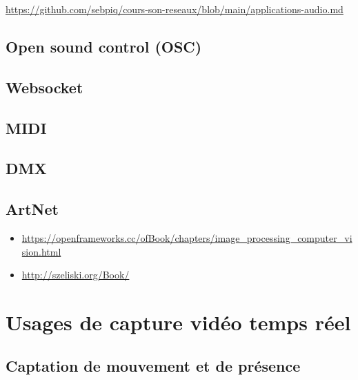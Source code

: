 \documentclass[
  french,
]{book}
\providecommand{\tightlist}{%
  \setlength{\itemsep}{0pt}\setlength{\parskip}{0pt}}
\begin{document}
\url{https://github.com/sebpiq/cours-son-reseaux/blob/main/applications-audio.md}

\hypertarget{protocole_osc}{%
\subsection{Open sound control (OSC)}\label{protocole_osc}}

\hypertarget{protocole_websocket}{%
\subsection{Websocket}\label{protocole_websocket}}

\hypertarget{protocole_midi}{%
\subsection{MIDI}\label{protocole_midi}}

\hypertarget{protocole_dmx}{%
\subsection{DMX}\label{protocole_dmx}}

\hypertarget{protocole_artnet}{%
\subsection{ArtNet}\label{protocole_artnet}}

\begin{itemize}
\tightlist
\item
  \url{https://openframeworks.cc/ofBook/chapters/image_processing_computer_vision.html}
\item
  \url{http://szeliski.org/Book/}
\end{itemize}

\hypertarget{usages-de-capture-viduxe9o-temps-ruxe9el}{%
\section{Usages de capture vidéo temps réel}\label{usages-de-capture-viduxe9o-temps-ruxe9el}}

\hypertarget{captation-de-mouvement-et-de-pruxe9sence}{%
\subsection{Captation de mouvement et de présence}\label{captation-de-mouvement-et-de-pruxe9sence}}
\end{document}
